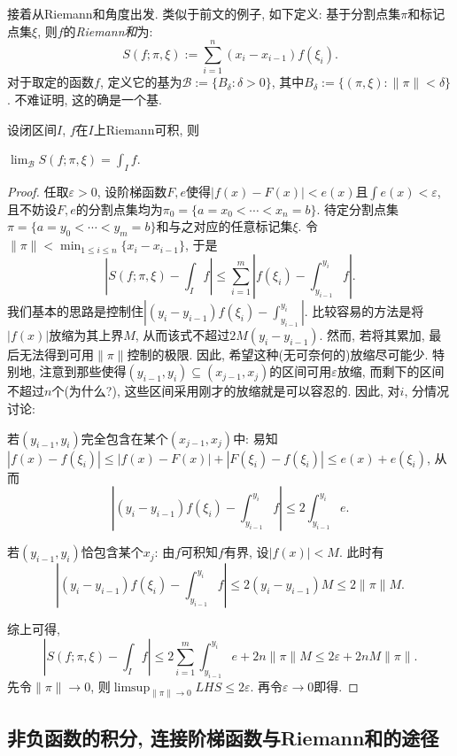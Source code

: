 接着从Riemann和角度出发. 类似于前文的例子, 如下定义: 基于分割点集$\pi$和标记点集$\xi$, 则$f$的\textit{Riemann和}为: $$S(f;\pi ,\xi) := \sum_{i=1}^{n} (x_i-x_{i-1})f(\xi _i) .$$
对于取定的函数$f$, 定义它的基为$\mathcal{B} := \{ B_{\delta}:\delta >0 \}$, 其中$B_{\delta} := \{ (\pi ,\xi) : \| \pi \|< \delta \}$. 不难证明, 这的确是一个基. 

\begin{proposition}{}
	设闭区间$I$, $f$在$I$上Riemann可积, 则
	\begin{center}
		$\displaystyle \lim_{\mathcal{B}} S(f;\pi ,\xi) = \int_I f.$
	\end{center}
\end{proposition}
\begin{proof}
	任取$\varepsilon >0$, 设阶梯函数$F,e$使得$|f(x)-F(x)|<e(x)$且$\int e(x) < \varepsilon$, 且不妨设$F,e$的分割点集均为$\pi _0 =\{ a=x_0<\cdots <x_n=b \}$. 待定分割点集$\pi = \{ a=y_0<\cdots <y_m=b \}$和与之对应的任意标记集$\xi$. 令$\| \pi \| < \min_{1 \leq i \leq n} \{ x_i-x_{i-1} \}$, 于是$$\left| S(f;\pi ,\xi) - \int_I f \right| \leq \sum_{i=1}^{m} \left| f(\xi _i)-\int_{y_{i-1}}^{y_i} f \right|. $$
	我们基本的思路是控制住$|(y_i-y_{i-1})f(\xi _i)-\int_{y_{i-1}}^{y_i}|$. 比较容易的方法是将$|f(x)|$放缩为其上界$M$, 从而该式不超过$2M(y_i-y_{i-1})$. 然而, 若将其累加, 最后无法得到可用$\| \pi \|$控制的极限. 因此, 希望这种(无可奈何的)放缩尽可能少. 特别地, 注意到那些使得$(y_{i-1},y_i) \subseteq (x_{j-1},x_j)$的区间可用$\varepsilon$放缩, 而剩下的区间不超过$n$个(为什么?), 这些区间采用刚才的放缩就是可以容忍的. 因此, 对$i$, 分情况讨论: 
	
	若$(y_{i-1},y_i)$完全包含在某个$(x_{j-1},x_j)$中: 易知$|f(x)-f(\xi _i)| \leq |f(x)-F(x)| + |F(\xi _i)-f(\xi _i)| \leq e(x)+e(\xi _i)$, 
	从而$$\left| (y_i-y_{i-1})f(\xi _i)-\int_{y_{i-1}}^{y_i} f \right| \leq 2\int_{y_{i-1}}^{y_i} e.$$
	
	若$(y_{i-1},y_i)$恰包含某个$x_j$: 由$f$可积知$f$有界, 设$|f(x)|<M$. 此时有$$\left| (y_i-y_{i-1})f(\xi _i)-\int_{y_{i-1}}^{y_i} f \right| \leq 2(y_i-y_{i-1})M \leq 2\| \pi \|M.$$
	
	综上可得, $$\left| S(f;\pi ,\xi) - \int_I f \right| \leq 2\sum_{i=1}^{m} \int_{y_{i-1}}^{y_i} e + 2n\| \pi \|M \leq 2\varepsilon + 2nM\| \pi \|.$$
	先令$\| \pi \|\to 0$, 则$\limsup_{\| \pi \|\to 0} LHS \leq 2\varepsilon$. 再令$\varepsilon \to 0$即得. 
\end{proof}


\subsection{非负函数的积分, 连接阶梯函数与Riemann和的途径}

